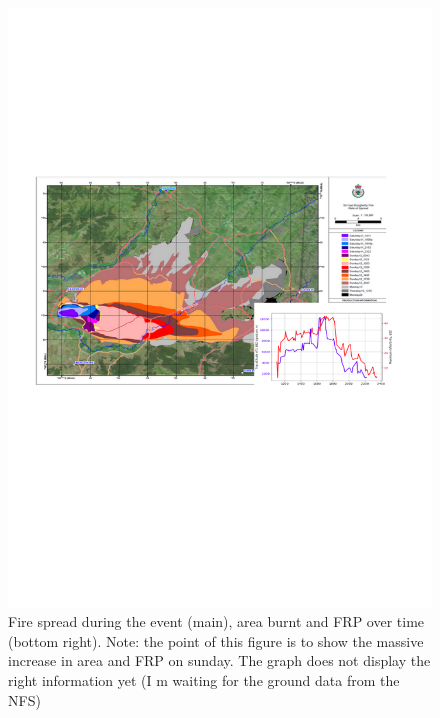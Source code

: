 \documentclass[12pt]{article}
\begin{document}
\begin{figure}[position]
   \caption{\label{ground_fire} Fire spread during the event (main), area burnt and FRP over time (bottom right).   {\color{red} Note: the point of this figure is to show the massive increase in area and FRP on sunday. The graph does not display the right information yet (I m waiting for the ground data from the NFS)} }
   \includegraphics[width=\textwidth]{../figures/ground_fire.png}
\end{figure}
\end{document}
